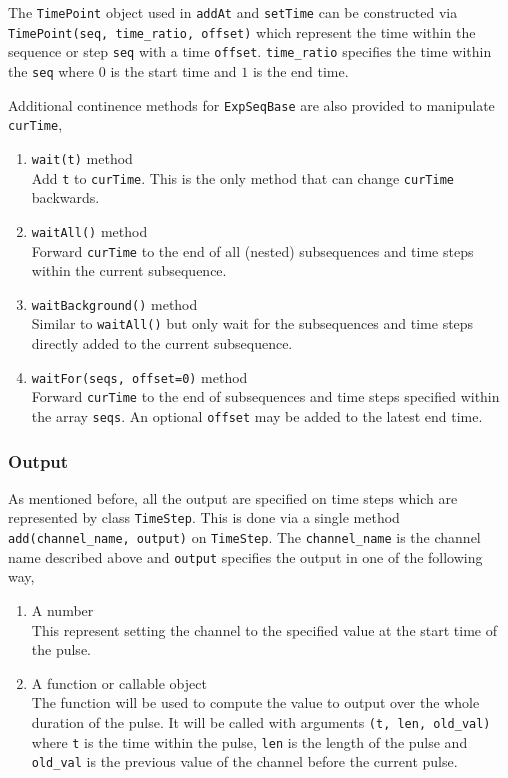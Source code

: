 The \verb`TimePoint` object used in \verb`addAt` and \verb`setTime`
can be constructed via \verb`TimePoint(seq, time_ratio, offset)`
which represent the time within the sequence or step \verb`seq` with a time \verb`offset`.
\verb`time_ratio` specifies the time within the \verb`seq` where $0$ is the start time
and $1$ is the end time.

Additional continence methods for \verb`ExpSeqBase` are also provided
to manipulate \verb`curTime`,
\begin{enumerate}
\item \verb`wait(t)` method\\
  Add \verb`t` to \verb`curTime`.
  This is the only method that can change \verb`curTime` backwards.
\item \verb`waitAll()` method\\
  Forward \verb`curTime` to the end of all (nested) subsequences and time steps
  within the current subsequence.
\item \verb`waitBackground()` method\\
  Similar to \verb`waitAll()` but only wait for the subsequences and time steps
  directly added to the current subsequence.
\item \verb`waitFor(seqs, offset=0)` method\\
  Forward \verb`curTime` to the end of subsequences and time steps specified
  within the array \verb`seqs`.
  An optional \verb`offset` may be added to the latest end time.
\end{enumerate}

\subsubsection{Output}

As mentioned before, all the output are specified on time steps
which are represented by class \verb`TimeStep`.
This is done via a single method \verb`add(channel_name, output)` on \verb`TimeStep`.
The \verb`channel_name` is the channel name described above
and \verb`output` specifies the output in one of the following way,
\begin{enumerate}
\item A number\\
  This represent setting the channel to the specified value at the start time of the pulse.
\item A function or callable object\\
  The function will be used to compute the value to output over the whole duration of the pulse.
  It will be called with arguments \verb`(t, len, old_val)` where
  \verb`t` is the time within the pulse, \verb`len` is the length of the pulse
  and \verb`old_val` is the previous value of the channel before the current pulse.
\end{enumerate}

